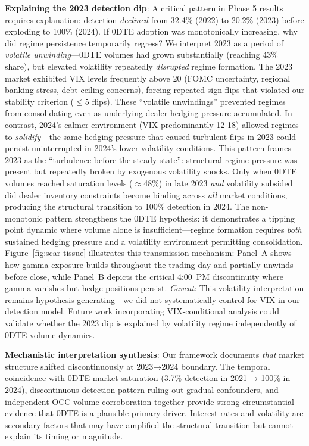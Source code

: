 \noindent\textbf{Explaining the 2023 detection dip}: A critical pattern in Phase 5 results requires explanation: detection \textit{declined} from 32.4\% (2022) to 20.2\% (2023) before exploding to 100\% (2024). If 0DTE adoption was monotonically increasing, why did regime persistence temporarily regress? We interpret 2023 as a period of \textit{volatile unwinding}---0DTE volumes had grown substantially (reaching 43\% share), but elevated volatility repeatedly \textit{disrupted} regime formation. The 2023 market exhibited VIX levels frequently above 20 (FOMC uncertainty, regional banking stress, debt ceiling concerns), forcing repeated sign flips that violated our stability criterion ($\leq$5 flips). These ``volatile unwindings'' prevented regimes from consolidating even as underlying dealer hedging pressure accumulated. In contrast, 2024's calmer environment (VIX predominantly 12-18) allowed regimes to \textit{solidify}---the same hedging pressure that caused turbulent flips in 2023 could persist uninterrupted in 2024's lower-volatility conditions. This pattern frames 2023 as the ``turbulence before the steady state'': structural regime pressure was present but repeatedly broken by exogenous volatility shocks. Only when 0DTE volumes reached saturation levels ($\approx$48\%) in late 2023 \textit{and} volatility subsided did dealer inventory constraints become binding across \textit{all} market conditions, producing the structural transition to 100\% detection in 2024. The non-monotonic pattern strengthens the 0DTE hypothesis: it demonstrates a tipping point dynamic where volume alone is insufficient---regime formation requires \textit{both} sustained hedging pressure and a volatility environment permitting consolidation. Figure~\ref{fig:scar-tissue} illustrates this transmission mechanism: Panel~A shows how gamma exposure builds throughout the trading day and partially unwinds before close, while Panel~B depicts the critical 4:00~PM discontinuity where gamma vanishes but hedge positions persist. \textit{Caveat}: This volatility interpretation remains hypothesis-generating---we did not systematically control for VIX in our detection model. Future work incorporating VIX-conditional analysis could validate whether the 2023 dip is explained by volatility regime independently of 0DTE volume dynamics.

\vspace{0.2cm}

\noindent\textbf{Mechanistic interpretation synthesis}: Our framework documents \textit{that} market structure shifted discontinuously at 2023→2024 boundary. The temporal coincidence with 0DTE market saturation (3.7\% detection in 2021 → 100\% in 2024), discontinuous detection pattern ruling out gradual confounders, and independent OCC volume corroboration together provide strong circumstantial evidence that 0DTE is a plausible primary driver. Interest rates and volatility are secondary factors that may have amplified the structural transition but cannot explain its timing or magnitude.

